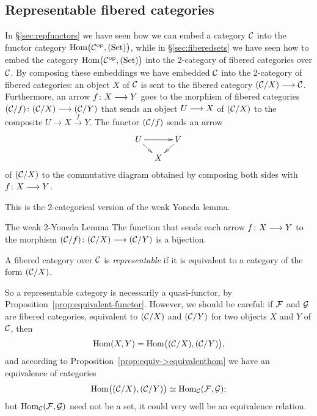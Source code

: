 \begin{3   FIBERED CATEGORIES}
\begin{3.6 Objects as fibcats and the 2-Yoneda}
\subsection{Representable fibered categories}

In \S\ref{sec:repfunctors} we have seen how we can embed a category $\mathcal{C}$ into the functor category $\mathrm{Hom}\bigl(\mathcal{C}^{\mathrm{op}}, (\mathrm{Set})\bigr)$, while in \S\ref{sec:fiberedsets} we have seen how to embed the category $\mathrm{Hom}\bigl(\mathcal{C}^{\mathrm{op}}, (\mathrm{Set})\bigr)$ into the 2-category of fibered categories over $\mathcal{C}$. By composing these embeddings we have embedded $\mathcal{C}$ into the 2-category of fibered categories: an object $X$ of $\mathcal{C}$ is sent to the fibered category $(\cC/X) \arr \cC$. Furthermore, an arrow $f \colon X \arr Y$ goes to the morphism of fibered categories $(\cC/f) \colon (\cC/X) \arr (\cC/Y)$ that sends an object $U \arr X$ of $(\mathcal{C}/X)$ to the composite $U \to X \overset f \to Y$. The functor $(\mathcal{C}/f)$ sends an arrow
   \[
   \xymatrix@-15pt{
   U\ar[rd]\ar[rr]&&V\ar[ld]\\
   &X&
   }
   \]
of $(\mathcal{C}/X)$ to the commutative diagram obtained by composing both sides with $f \colon X \arr Y$. 

This is the 2-categorical version of the weak Yoneda lemma.

\begin{named}{The weak 2-Yoneda Lemma}
%
The function that sends each arrow $f \colon X \arr Y$ to the morphism $(\cC/f) \colon (\cC/X) \arr (\cC/Y)$ is a bijection.
\end{named}

\begin{definition}
A fibered category over $\mathcal{C}$ is \emph{representable}%
%
 if it is equivalent to a category of the form $(\mathcal{C}/X)$.
\end{definition}

So a representable category is necessarily a quasi-functor, by Proposition~\ref{prop:equivalent-functor}. However, we should be careful: if $\mathcal{F}$ and $\mathcal{G}$ are fibered categories, equivalent to $(\mathcal{C}/X)$ and $(\mathcal{C}/Y)$ for two objects $X$ and $Y$ of $\mathcal{C}$, then
   \[
   \operatorname{Hom}(X, Y) = \operatorname{Hom}\bigl( (\mathcal{C}/X),
   (\mathcal{C}/Y)\bigr),
   \]
and according to Proposition~\ref{prop:equiv->equivalenthom} we have an equivalence of categories
   \[
   \operatorname{Hom}\bigl( (\mathcal{C}/X), (\mathcal{C}/Y)\bigr)
   \simeq \operatorname{Hom}_{\mathcal{C}}(\mathcal{F}, \mathcal{G});
   \]
but $\operatorname{Hom}_{\mathcal{C}}(\mathcal{F}, \mathcal{G})$ need not be a set, it could very well be an equivalence relation.




\end{3.6 Objects as fibcats and the 2-Yoneda}
\end{3   FIBERED CATEGORIES}

